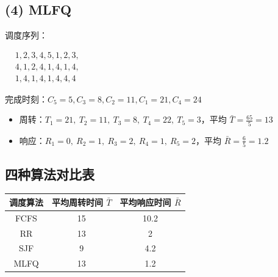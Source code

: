 \documentclass[fleqn]{ctexart}
\begin{document}
\subsection*{(4) MLFQ}

调度序列：

\medskip
$
\begin{aligned}
&1,2,3,4,5,1,2,3,\\
&4,1,2,4,1,4,1,4,\\
&1,4,1,4,1,4,4,4
\end{aligned}
$

\medskip
完成时刻：$C_5=5, C_3=8, C_2=11, C_1=21, C_4=24$

\begin{itemize}
	\item 周转：$T_1=21,\ T_2=11,\ T_3=8,\ T_4=22,\ T_5=3$，平均 $\bar T=\frac{65}{5}=13$
	\item 响应：$R_1=0,\ R_2=1,\ R_3=2,\ R_4=1,\ R_5=2$，平均 $\bar R=\frac{6}{5}=1.2$
\end{itemize}

\medskip

\subsection*{四种算法对比表}
\begin{center}
\begin{tabular}{|c|c|c|}
\hline
调度算法 & 平均周转时间 $\bar T$ & 平均响应时间 $\bar R$ \\
\hline
FCFS & 15 & 10.2 \\
\hline
RR & 13 & 2 \\
\hline
SJF & 9 & 4.2 \\
\hline
MLFQ & 13 & 1.2 \\
\hline
\end{tabular}
\end{center}
\end{document}
